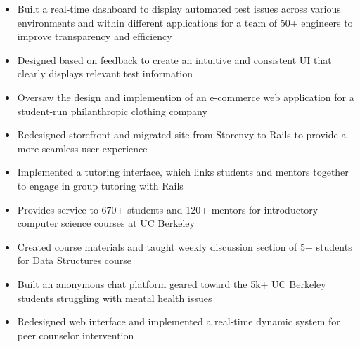 \documentclass{resume}
\begin{document}
\begin{itemize}
\item Built a real-time dashboard to display automated test issues across various environments and within different applications for a team of 50+ engineers to improve transparency and efficiency
\item Designed based on feedback to create an intuitive and consistent UI that clearly displays relevant test information
\end{itemize}
\begin{itemize}
\item Oversaw the design and implemention of an e-commerce web application for a student-run philanthropic clothing company
\item Redesigned storefront and migrated site from Storenvy to Rails to provide a more seamless user experience
\end{itemize}
\begin{itemize}
\item Implemented a tutoring interface, which links students and mentors together to engage in group tutoring with Rails
\item Provides service to 670+ students and 120+ mentors for introductory computer science courses at UC Berkeley
\item Created course materials and taught weekly discussion section of 5+ students for Data Structures course
\end{itemize}
\begin{itemize}
\item Built an anonymous chat platform geared toward the 5k+ UC Berkeley students struggling with mental health issues
\item Redesigned web interface and implemented a real-time dynamic system for peer counselor intervention
\end{itemize}

\end{document}
